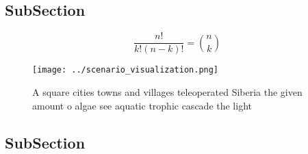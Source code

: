 \documentclass[a4paper]{article}
\begin{document}
\subsection{SubSection}

\[ \frac{n!}{k!(n-k)!} = \binom{n}{k} \]

\begin{figure}
\centering
\texttt{[image: ../scenario\_visualization.png]}
\caption{A square cities towns and villages teleoperated Siberia the given amount o algae see aquatic trophic cascade the light 
}
\end{figure}
 
\subsection{SubSection}
\end{document}
